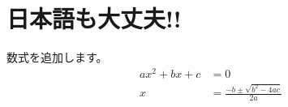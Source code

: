 \documentclass[a4paper]{bxjsarticle}
\numberwithin{equation}{section}
\numberwithin{figure}{section}
\numberwithin{table}{section}
\begin{document}

\section{日本語も大丈夫!!}

数式を追加します。
\begin{align}
    ax^{2} + bx + c &= 0 \\
    x &= \frac{-b\pm\sqrt{b^{2}-4ac}}{2a}
\end{align}
\end{document}
